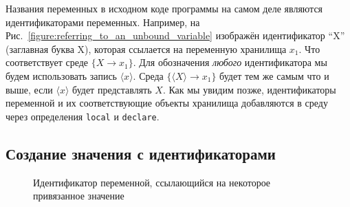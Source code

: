 Названия переменных в исходном коде программы на самом деле являются идентификаторами переменных. Например, на Рис.~\ref{figure:referring_to_an_unbound_variable} изображён идентификатор ``X'' (заглавная буква X), которая ссылается на переменную хранилища $x_{1}$. Что соответствует среде $\{X \to x_{1}\}$. Для обозначения \emph{любого} идентификатора мы будем использовать запись $\langle x \rangle$. Среда $\{\langle X \rangle \to x_{1}\}$ будет тем же самым что и выше, если $\langle x \rangle$ будет представлять $X$. Как мы увидим позже, идентификаторы переменной и их соответствующие объекты хранилища добавляются в среду через определения \lstinline|local| и \lstinline|declare|.

\subsection{Создание значения с идентификаторами}

\begin{figure}
\caption{Идентификатор переменной, ссылающийся на некоторое привязанное зна\-че\-ние}
\label{figure:identifier_referring_to_a_bound_variable}
\end{figure}

